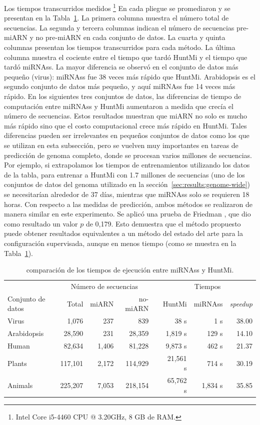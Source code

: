 Los tiempos transcurridos medidos \footnote{Intel \textregistered Core \texttrademark i5-4460 CPU @ 3.20GHz, 8 GB de RAM.} En cada pliegue se promediaron y se
presentan en la Tabla~\ref{tab:times}. La primera columna muestra el número total de secuencias. La segunda y tercera columnas indican el número de
secuencias pre-miARN y no pre-miARN en cada conjunto de datos. La cuarta y quinta columnas presentan los tiempos transcurridos para cada método. La última
columna muestra el cociente entre el tiempo que tardó HuntMi y el tiempo que tardó miRNAss. La mayor diferencia se observó en el conjunto de datos más
pequeño (virus): miRNAss fue 38 veces más rápido que HuntMi. Arabidopsis es el segundo conjunto de datos más pequeño, y aquí miRNAss fue 14 veces más
rápido. En los siguientes tres conjuntos de datos, las diferencias de tiempo de computación entre miRNAss y HuntMi aumentaron a medida que crecía el número
de secuencias. Estos resultados muestran que miARN no solo es mucho más rápido sino que el costo computacional crece más rápido en HuntMi. Tales
diferencias pueden ser irrelevantes en pequeños conjuntos de datos como los que se utilizan en esta subsección, pero se vuelven muy importantes en tareas de
predicción de genoma completo, donde se procesan varios millones de secuencias. Por ejemplo, si extrapolamos los tiempos de entrenamientos utilizando los
datos de la tabla, para entrenar a HuntMi con 1.7 millones de secuencias (uno de los conjuntos de datos del genoma utilizado en la sección~\ref{sec:results:genome-wide})
se necesitarían alrededor de 37 días, mientras que miRNAss solo se requieren 18 horas.
Con respecto a las medidas de predicción, ambos métodos se realizaron de manera similar en este experimento. Se aplicó una prueba de Friedman \citep{friedman1937use},
que dio como resultado un valor $ p $ de 0,179. Esto demuestra que el método propuesto puede obtener resultados equivalentes a un método
del estado del arte para la configuración supervisada, aunque en menos tiempo (como se muestra en la Tabla~\ref{tab:times}).
\begin{table}[t]
	\small
	\centering
	\begin{tabular}{@{}lrrrrrrr@{}} \toprule
		&  \multicolumn{3}{c}{Número de secuencias} & & \multicolumn{3}{c}{Tiempos} \\ \cmidrule{2-4} \cmidrule{6-8}
		Conjunto de datos     &   Total  &   miARN   &  no-miARN& &  HuntMi  & miRNAss & \textit{speedup} \\\midrule
		Virus       &   1,076  &      237  &       839 & &     38 s &     1 s & 38.00    \\
		Arabidopsis &  28,590  &      231  &    28,359 & &  1,819 s &   129 s & 14.10    \\
		Human       &  82,634  &    1,406  &    81,228 & &  9,873 s &   462 s & 21.37    \\
		Plants      & 117,101  &    2,172  &   114,929 & & 21,561 s &   714 s & 30.19    \\
		Animals     & 225,207  &    7,053  &   218,154 & & 65,762 s & 1,834 s & 35.85    \\\bottomrule
	\end{tabular}
	\caption[Comparación de tiempos de ejecución]{comparación de los tiempos de ejecución entre miRNAss y HuntMi.\label{tab:times}}
\end{table}
